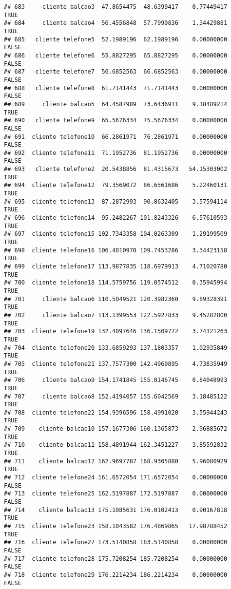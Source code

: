 \documentclass[
]{article}
\begin{document}
\begin{verbatim}
## 683     cliente balcao3  47.8654475  48.6399417    0.77449417     TRUE
## 684     cliente balcao4  56.4556848  57.7999836    1.34429881     TRUE
## 685   cliente telefone5  52.1989196  62.1989196    0.00000000    FALSE
## 686   cliente telefone6  55.8827295  65.8827295    0.00000000    FALSE
## 687   cliente telefone7  56.6852563  66.6852563    0.00000000    FALSE
## 688   cliente telefone8  61.7141443  71.7141443    0.00000000    FALSE
## 689     cliente balcao5  64.4587989  73.6436911    9.18489214     TRUE
## 690   cliente telefone9  65.5676334  75.5676334    0.00000000    FALSE
## 691  cliente telefone10  66.2861971  76.2861971    0.00000000    FALSE
## 692  cliente telefone11  71.1952736  81.1952736    0.00000000    FALSE
## 693   cliente telefone2  20.5438856  81.4315673   54.15303002     TRUE
## 694  cliente telefone12  79.3569072  86.6561686    5.22460131     TRUE
## 695  cliente telefone13  87.2872993  90.8632405    3.57594114     TRUE
## 696  cliente telefone14  95.2482267 101.8243326    6.57610593     TRUE
## 697  cliente telefone15 102.7343358 104.0263309    1.29199509     TRUE
## 698  cliente telefone16 106.4010970 109.7453286    3.34423158     TRUE
## 699  cliente telefone17 113.9877835 118.6979913    4.71020780     TRUE
## 700  cliente telefone18 114.5759756 119.0574512    0.35945994     TRUE
## 701     cliente balcao6 110.5049521 120.3982360    9.89328391     TRUE
## 702     cliente balcao7 113.1399553 122.5927833    9.45282800     TRUE
## 703  cliente telefone19 132.4097646 136.1509772    3.74121263     TRUE
## 704  cliente telefone20 133.6859293 137.1803357    1.02935849     TRUE
## 705  cliente telefone21 137.7577300 142.4960895    4.73835949     TRUE
## 706     cliente balcao9 154.1741845 155.0146745    0.84048993     TRUE
## 707     cliente balcao8 152.4194057 155.6042569    3.18485122     TRUE
## 708  cliente telefone22 154.9396596 158.4991020    3.55944243     TRUE
## 709    cliente balcao10 157.1677306 160.1365873    2.96885672     TRUE
## 710    cliente balcao11 158.4891944 162.3451227    3.85592832     TRUE
## 711    cliente balcao12 162.9697787 168.9305880    5.96080929     TRUE
## 712  cliente telefone24 161.6572054 171.6572054    0.00000000    FALSE
## 713  cliente telefone25 162.5197887 172.5197887    0.00000000    FALSE
## 714    cliente balcao13 175.1085631 176.0102413    0.90167818     TRUE
## 715  cliente telefone23 158.1043582 176.4869865   17.98788452     TRUE
## 716  cliente telefone27 173.5140858 183.5140858    0.00000000    FALSE
## 717  cliente telefone28 175.7208254 185.7208254    0.00000000    FALSE
## 718  cliente telefone29 176.2214234 186.2214234    0.00000000    FALSE

\end{verbatim}
\end{document}
